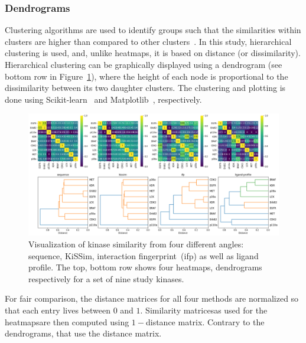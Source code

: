 \documentclass[9pt,training]{livecoms}
\begin{document}
\subsubsection{Dendrograms}
Clustering algorithms are used to identify groups such that the similarities within clusters are higher than compared to other clusters~\cite{Hastie_2009_ESLii}. In this study, hierarchical clustering is used, and, unlike heatmaps, it is based on distance (or dissimilarity).
Hierarchical clustering can be graphically displayed using a dendrogram (see bottom row in Figure~\ref{fig:comparison}), where the height of each node is proportional to the dissimilarity between its two daughter clusters.
The clustering and plotting is done using Scikit-learn~\cite{Pedregosa_2011_JMLR} and Matplotlib~\cite{Hunter_2007_IEEE}, respectively.

\begin{figure}
    \centering
    \includegraphics[width=\textwidth]{all_comparison.png}
    \caption{Visualization of kinase similarity from four different angles: sequence, KiSSim, interaction fingerprint~(ifp) as well as ligand profile. The top, bottom row shows four heatmaps, dendrograms respectively for a set of nine study kinases.}
    \label{fig:comparison}
\end{figure}

For fair comparison, the distance matrices for all four methods are normalized so that each entry lives between $0$ and $1$. Similarity matrices\textemdash as used for the heatmaps\textemdash are then computed using $1-$distance matrix. Contrary to the dendrograms, that use the distance matrix.
\end{document}
